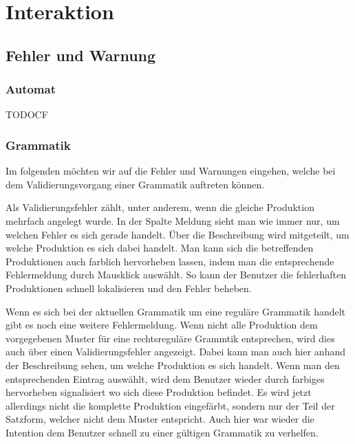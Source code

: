 

\chapter{Interaktion}\label{Interaction}


\section{Fehler und Warnung}


\subsection{Automat}

TODOCF


\subsection{Grammatik}

Im folgenden möchten wir auf die Fehler und Warnungen eingehen, welche bei dem
Validierungsvorgang einer Grammatik auftreten können.\vspace{10pt}

Als Validierungsfehler zählt, unter anderem, wenn die gleiche Produktion mehrfach
angelegt wurde. In der Spalte Meldung sieht man wie immer nur, um welchen Fehler
es sich gerade handelt. Über die Beschreibung wird mitgeteilt, um welche
Produktion es sich dabei handelt. Man kann sich die betreffenden Produktionen
auch farblich hervorheben lassen, indem man die entsprechende Fehlermeldung durch
Mausklick auswählt. So kann der Benutzer die fehlerhaften Produktionen schnell
lokalisieren und den Fehler beheben.\vspace{10pt}

Wenn es sich bei der aktuellen Grammatik um eine reguläre Grammatik handelt
gibt es noch eine weitere Fehlermeldung. Wenn nicht alle Produktion dem
vorgegebenen Muster für eine rechtsreguläre Grammtik entsprechen, wird dies auch
über einen Validierungsfehler angezeigt. Dabei kann man auch hier anhand der
Beschreibung sehen, um welche Produktion es sich handelt. Wenn man den
entsprechenden Eintrag auswählt, wird dem Benutzer wieder durch farbiges
hervorheben signalisiert wo sich diese Produktion befindet. Es wird jetzt
allerdings nicht die komplette Produktion eingefärbt, sondern nur der Teil der
Satzform, welcher nicht dem Muster entspricht. Auch hier war wieder die
Intention dem Benutzer schnell zu einer gültigen Grammatik zu
verhelfen.\vspace{10pt}

